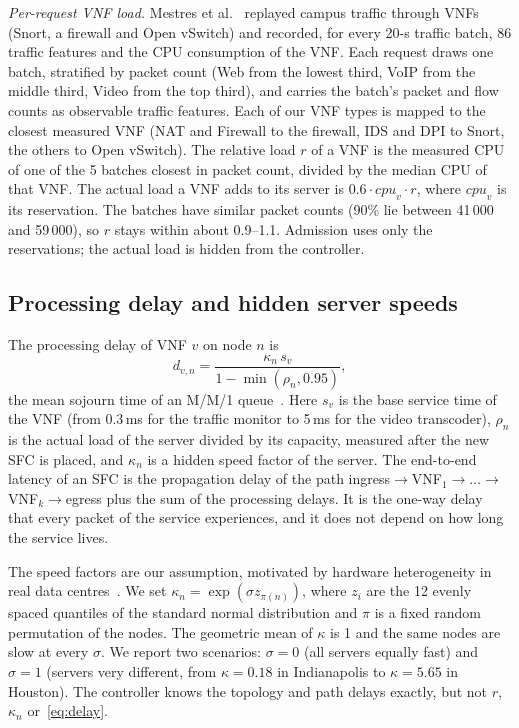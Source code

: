\documentclass[conference,a4paper]{IEEEtran}
\begin{document}
\emph{Per-request VNF load.} Mestres et al.~\cite{mestres2017kdn} replayed campus traffic through VNFs (Snort,
a firewall and Open vSwitch) and recorded, for every 20-s traffic batch, 86 traffic features and the CPU
consumption of the VNF. Each request draws one batch, stratified by packet count (Web from the lowest third, VoIP
from the middle third, Video from the top third), and carries the batch's packet and flow counts as observable
traffic features. Each of our VNF types is mapped to the closest measured VNF (NAT and Firewall to the firewall, IDS
and DPI to Snort, the others to Open vSwitch). The relative load $r$ of a VNF is the measured CPU of one of the
5 batches closest in packet count, divided by the median CPU of that VNF. The actual load a VNF adds to its server is
$0.6 \cdot \mathit{cpu}_v \cdot r$, where $\mathit{cpu}_v$ is its reservation. The batches have similar packet counts
(90\% lie between 41\,000 and 59\,000), so $r$ stays within about 0.9--1.1. Admission uses only the reservations;
the actual load is hidden from the controller.

\subsection{Processing delay and hidden server speeds}
The processing delay of VNF $v$ on node $n$ is
\begin{equation}
d_{v,n} = \frac{\kappa_n \, s_v}{1 - \min(\rho_n, 0.95)},
\label{eq:delay}
\end{equation}
the mean sojourn time of an M/M/1 queue~\cite{kleinrock1975queueing}. Here $s_v$ is the base service time of the
VNF (from 0.3\,ms for the traffic monitor to 5\,ms for the video transcoder), $\rho_n$ is the actual load of the
server divided by its capacity, measured after the new SFC is placed, and $\kappa_n$ is a hidden speed factor of
the server. The end-to-end latency of an SFC is the propagation delay of the path ingress$\to$VNF$_1\to\dots\to$
VNF$_k\to$egress plus the sum of the processing delays. It is the one-way delay that every packet of the service
experiences, and it does not depend on how long the service lives.

The speed factors are our assumption, motivated by hardware heterogeneity in real data
centres~\cite{reiss2012heterogeneity,delimitrou2013paragon}. We set $\kappa_n = \exp(\sigma z_{\pi(n)})$, where $z_i$
are the 12 evenly spaced quantiles of the standard normal distribution and $\pi$ is a fixed random permutation of
the nodes. The geometric mean of $\kappa$ is 1 and the same nodes are slow at every $\sigma$. We report two
scenarios: $\sigma = 0$ (all servers equally fast) and $\sigma = 1$ (servers very different, from
$\kappa = 0.18$ in Indianapolis to $\kappa = 5.65$ in Houston). The controller knows the topology and path delays
exactly, but not $r$, $\kappa_n$ or~\eqref{eq:delay}.
\end{document}
